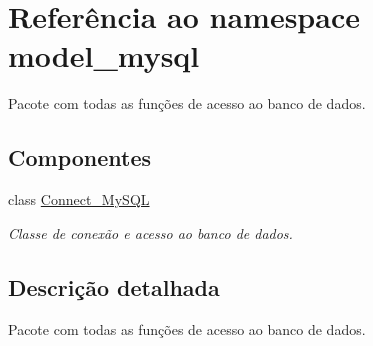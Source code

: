 \hypertarget{namespacemodel__mysql}{\section{\-Referência ao namespace model\-\_\-mysql}
\label{namespacemodel__mysql}
}


\-Pacote com todas as funções de acesso ao banco de dados.  


\subsection*{\-Componentes}
\begin{DoxyCompactItemize}
\item 
class \hyperlink{classmodel__mysql_1_1_connect___my_s_q_l}{\-Connect\-\_\-\-My\-S\-Q\-L}
\begin{DoxyCompactList}\small\item\em \-Classe de conexão e acesso ao banco de dados. \end{DoxyCompactList}\end{DoxyCompactItemize}


\subsection{\-Descrição detalhada}
\-Pacote com todas as funções de acesso ao banco de dados. 